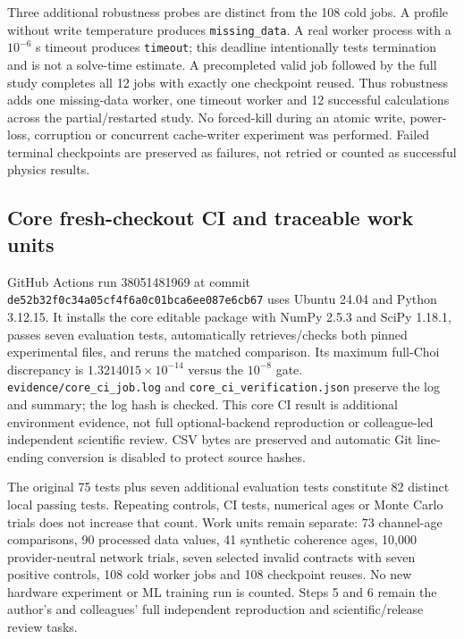 \documentclass[10pt,a4paper]{article}
\newcommand{\code}[1]{\texttt{#1}}
\begin{document}
Three additional robustness probes are distinct from the 108 cold jobs. A profile without write temperature produces \code{missing\_data}. A real worker process with a $10^{-6}$ s timeout produces \code{timeout}; this deadline intentionally tests termination and is not a solve-time estimate. A precompleted valid job followed by the full study completes all 12 jobs with exactly one checkpoint reused. Thus robustness adds one missing-data worker, one timeout worker and 12 successful calculations across the partial/restarted study. No forced-kill during an atomic write, power-loss, corruption or concurrent cache-writer experiment was performed. Failed terminal checkpoints are preserved as failures, not retried or counted as successful physics results.

\subsection{Core fresh-checkout CI and traceable work units}
GitHub Actions run 38051481969 at commit \code{de52b32f0c34a05cf4f6a0c01bca6ee087e6cb67} uses Ubuntu 24.04 and Python 3.12.15. It installs the core editable package with NumPy 2.5.3 and SciPy 1.18.1, passes seven evaluation tests, automatically retrieves/checks both pinned experimental files, and reruns the matched comparison. Its maximum full-Choi discrepancy is $1.3214015\times10^{-14}$ versus the $10^{-8}$ gate. \code{evidence/core\_ci\_job.log} and \code{core\_ci\_verification.json} preserve the log and summary; the log hash is checked. This core CI result is additional environment evidence, not full optional-backend reproduction or colleague-led independent scientific review. CSV bytes are preserved and automatic Git line-ending conversion is disabled to protect source hashes.

The original 75 tests plus seven additional evaluation tests constitute 82 distinct local passing tests. Repeating controls, CI tests, numerical ages or Monte Carlo trials does not increase that count. Work units remain separate: 73 channel-age comparisons, 90 processed data values, 41 synthetic coherence ages, 10,000 provider-neutral network trials, seven selected invalid contracts with seven positive controls, 108 cold worker jobs and 108 checkpoint reuses. No new hardware experiment or ML training run is counted. Steps 5 and 6 remain the author's and colleagues' full independent reproduction and scientific/release review tasks.
\end{document}
